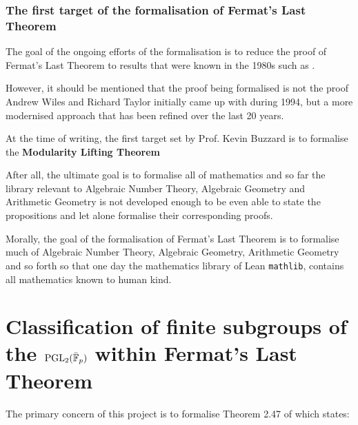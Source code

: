 \subsubsection{The first target of the formalisation of Fermat's Last Theorem}

The goal of the ongoing efforts of the formalisation is to reduce the proof of Fermat's Last Theorem to results that were known in the 1980s such as .

However, it should be mentioned that the proof being formalised is not the proof Andrew Wiles and Richard Taylor initially came up with during 1994, but a more modernised approach that has been refined over the last 20 years.

At the time of writing, the first target set by Prof. Kevin Buzzard is to formalise the \textbf{Modularity Lifting Theorem}



After all, the ultimate goal is to formalise all of mathematics and so far the library relevant to Algebraic Number Theory, Algebraic Geometry and Arithmetic Geometry is not developed enough
to be even able to state the propositions and let alone formalise their corresponding proofs.

Morally, the goal of the formalisation of Fermat's Last Theorem is to formalise much of Algebraic Number Theory, Algebraic Geometry, Arithmetic Geometry and so forth so that one day
the mathematics library of Lean \texttt{mathlib}, contains all mathematics known to human kind.



\section{Classification of finite subgroups of the $\operatorname{PGL}_2(\bar{\mathbb{F}}_p)$ within Fermat's Last Theorem}

The primary concern of this project is to formalise Theorem 2.47 of \cite{dtt} which states:


